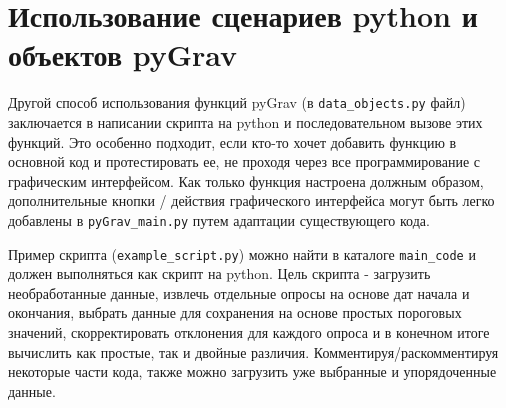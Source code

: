 \begin{itemize}
\end{itemize}

\section[Использование сценариев python и объектов pyGrav]{Использование сценариев python и объектов pyGrav}
\label{sec:using_a_python_script_and_pygrav_objects}

Другой способ использования функций pyGrav (в \verb|data_objects.py| файл) заключается
в написании скрипта на python и последовательном вызове этих функций. Это
особенно подходит, если кто-то хочет добавить функцию в основной код и
протестировать ее, не проходя через все программирование с графическим
интерфейсом. Как только функция настроена должным образом, дополнительные кнопки
/ действия графического интерфейса могут быть легко добавлены в \verb|pyGrav_main.py|
путем адаптации существующего кода.

Пример скрипта (\verb|example_script.py|) можно найти в каталоге \verb|main_code| и должен
выполняться как скрипт на python. Цель скрипта - загрузить необработанные
данные, извлечь отдельные опросы на основе дат начала и окончания, выбрать
данные для сохранения на основе простых пороговых значений, скорректировать
отклонения для каждого опроса и в конечном итоге вычислить как простые, так и
двойные различия. Комментируя/раскомментируя некоторые части кода, также можно
загрузить уже выбранные и упорядоченные данные.
